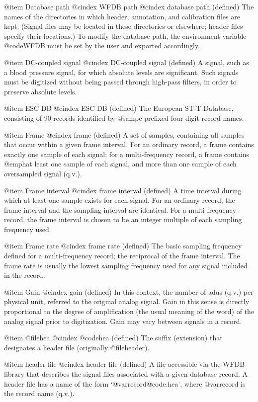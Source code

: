 {{{{{{{{{@item Database path
@cindex WFDB path
@cindex database path (defined)
The names of the directories in which header, annotation, and calibration files
are kept.  (Signal files may be located in these directories or elsewhere;
header files specify their locations.)  To modify the database path, the
environment variable @code{WFDB} must be set by the user and exported
accordingly.

@item DC-coupled signal
@cindex DC-coupled signal (defined)
A signal, such as a blood pressure signal, for which absolute levels are
significant.  Such signals must be digitized without being passed
through high-pass filters, in order to preserve absolute levels.

@item ESC DB
@cindex ESC DB (defined)
The European ST-T Database, consisting of 90 records identified by
@samp{e}-prefixed four-digit record names.

@item Frame
@cindex frame (defined)
A set of samples, containing all samples that occur within a given
frame interval.  For an ordinary record, a frame contains exactly one
sample of each signal;  for a multi-frequency record, a frame contains
@emph{at least} one sample of each signal, and more than one sample of
each oversampled signal (q.v.).

@item Frame interval
@cindex frame interval (defined)
A time interval during which at least one sample exists for each signal.
For an ordinary record, the frame interval and the sampling interval are
identical.  For a multi-frequency record, the frame interval is chosen
to be an integer multiple of each sampling frequency used.

@item Frame rate
@cindex frame rate (defined)
The basic sampling frequency defined for a multi-frequency record;  the
reciprocal of the frame interval.  The frame rate is usually the lowest
sampling frequency used for any signal included in the record.

@item Gain
@cindex gain (defined)
In this context, the number of adus (q.v.) per physical unit, referred to the
original analog signal.  Gain in this sense is directly proportional to the
degree of amplification (the usual meaning of the word) of the analog
signal prior to digitization.  Gain may vary between signals in a
record.

@item @file{hea}
@cindex @code{hea} (defined)
The suffix (extension) that designates a header file (originally
@file{header}).

@item header file
@cindex header file (defined)
A file accessible via the WFDB library that describes the signal files
associated with a given database record.  A header file has a name of
the form `@var{record}@code{.hea}', where @var{record} is the record name
(q.v.).

}}}}}}}}}
